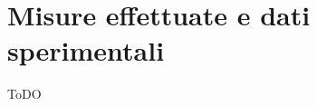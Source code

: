 \chapter{Misure effettuate e dati sperimentali}
\label{conclusioni}
\thispagestyle{empty}

\noindent ToDO
